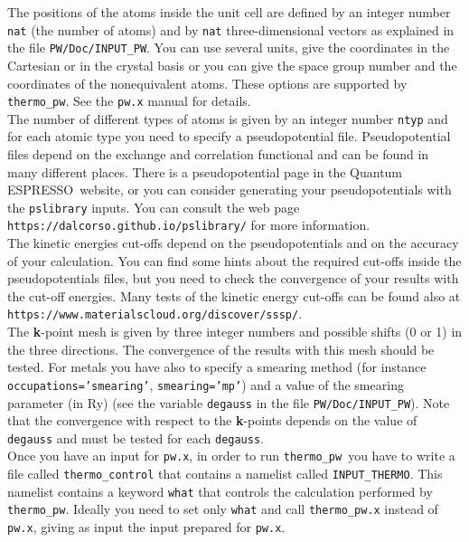 \documentclass[12pt,a4paper]{article}
\def\qe{{\sc Quantum ESPRESSO}}
\def\thermo{\texttt{thermo\_pw}}
\begin{document}
The positions of the atoms inside the unit cell are defined by an integer
number \texttt{nat} (the number of atoms) and by \texttt{nat} 
three-dimensional vectors as explained in the file \texttt{PW/Doc/INPUT\_PW}.
You can use several units, give the coordinates in the Cartesian or in the
crystal basis or you can give the space group number and the
coordinates of the nonequivalent atoms. 
These options are supported by \thermo. See the \texttt{pw.x} manual
for details. \\

The number of different types of atoms is given by an integer number 
\texttt{ntyp} and for each atomic type you need to specify a 
pseudopotential file. Pseudopotential files depend on the exchange and 
correlation functional and can be found in many 
different places. There is a pseudopotential page in the \qe\ website, or 
you can consider generating your pseudopotentials with the \texttt{pslibrary} 
inputs. You can consult the web page \texttt{https://dalcorso.github.io/pslibrary/} for more information. \\

The kinetic energies cut-offs depend on the pseudopotentials
and on the accuracy of your calculation. You can 
find some hints about the required cut-offs inside the pseudopotentials files,
but you need to check the convergence of your results with the cut-off 
energies. Many tests of the kinetic energy cut-offs can be found also at 
\texttt{https://www.materialscloud.org/discover/sssp/}. \\

The {\bf k}-point mesh is given by three integer numbers and possible
shifts (0 or 1) in the three directions. The convergence of the results
with this mesh should be tested. For metals you have also to specify a
smearing method (for instance \texttt{occupations='smearing'}, 
\texttt{smearing='mp'}) and a value of the smearing parameter (in Ry) 
(see the variable \texttt{degauss} in the file \texttt{PW/Doc/INPUT\_PW}). 
Note that the convergence with respect to the {\bf k}-points depends on
the value of \texttt{degauss} and must be tested for each \texttt{degauss}. \\

Once you have an input for \texttt{pw.x}, in order to run \thermo\ you
have to write a file called \texttt{thermo\_control} that contains a
namelist called \texttt{INPUT\_THERMO}. This namelist contains a keyword
\texttt{what} that controls the calculation performed by 
\thermo. Ideally you need to set only \texttt{what} and call 
\texttt{thermo\_pw.x} instead of \texttt{pw.x}, giving as input the 
input prepared for \texttt{pw.x}.
\end{document}

